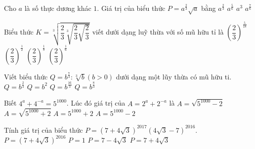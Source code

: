 \begin{ex}%
	Cho $a$ là số thực dương khác $1$. Giá trị của  biểu thức $P=a^{\tfrac{2}{3}} \sqrt{a}$ bằng
	 \choice
		 {$a^{\tfrac{2}{3}}$}
		{$a^{\tfrac{5}{6}}$} 
		{$a^3$} 
		{\True $a^{\tfrac{7}{6}}$} 
\end{ex}

\begin{ex}%
	Biểu thức $K=\sqrt[3]{\dfrac{2}{3}\sqrt[3]{\dfrac{2}{3}\sqrt{\dfrac{2}{3}}}}$ viết dưới dạng luỹ thừa với số mũ hữu  tỉ là
	 \choice
		{$\left(\dfrac{2}{3}\right)^{\tfrac{5}{18}}$} 
		{\True  $\left(\dfrac{2}{3}\right)^{\tfrac{1}{2}}$}
		{$\left(\dfrac{2}{3}\right)^{\tfrac{1}{8}}$} 
		{$\left(\dfrac{2}{3}\right)^{\tfrac{1}{6}}$} 
\end{ex}

\begin{ex}%
	Viết biểu  thức $Q=b^{\frac{7}{3}}:\sqrt[3]{b}(b>0)$ dưới dạng một lũy thừa có mũ hữu ti.
	 \choice
		{$Q=b^{\frac{2}{3}}$} 
		{\True  $Q=b^2$}
		{$Q=b^{\frac{16}{3}}$} 
		{$Q=b^{\frac{8}{3}}$} 
\end{ex}

\begin{ex}%
	Biết $4^a+4^{-a}=5^{1000}$.  Lúc đó giá trị của $A=2^a+2^{-a}$ là
	 \choice
		 {$A=\sqrt{5^{1000}-2}$}
		{\True $A=\sqrt{5^{1000}+2}$} 
		{$A=5^{1000}+2$} 
		 {$A=5^{1000}-2$}
\end{ex}

\begin{ex}%
	Tính giá  trị của biểu thức $P=\left(7+4\sqrt 3\right)^{2017}\left(4\sqrt 3-7\right)^{2016}$.
	 \choice
		{$P=\left(7+4\sqrt 3\right)^{2016}$} 
		{$P=1$} 
		{$P=7-4\sqrt  3$}
		{\True $P=7+4\sqrt  3$}
\end{ex}

